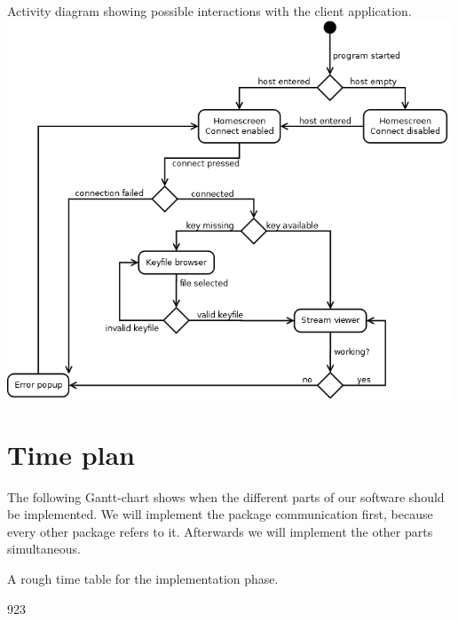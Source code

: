 \documentclass[a4paper,10pt]{scrartcl}
\begin{document}
\begin{illustration}{Activity diagram showing possible interactions with the client application.}
\includegraphics [width=500px]{figures/gui_activity_1/gui_activity_1.png}
\end{illustration}

\section{Time plan}
The following Gantt-chart shows when the different parts of our software should be implemented. We will implement the package communication first, because every other package refers to it. Afterwards we will implement the other parts simultaneous.
   \begin{illustration}{A rough time table for the implementation phase.}
  \begin{gantt}[xunitlength=0.5cm,fontsize=\small,titlefontsize=\small,drawledgerline=true]{9}{23}
    \begin{ganttitle}
    \end{ganttitle}
    \begin{ganttitle}
    \end{ganttitle}


  \end{gantt}
  \end{illustration}

{}

\end{document}
